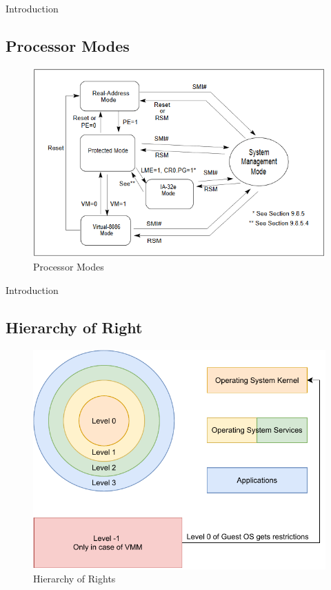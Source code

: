 \documentclass[11pt, aspectratio=169, modernfonts]{beamer}
\theoremstyle{definition}
\theoremstyle{remark}
\begin{document}
\begin{frame}{Introduction}
    \subsection{Processor Modes}
    \begin{figure}
        \centering
        \includegraphics[scale=0.56]{graphics/ProcessorModes.PNG}
        \caption{Processor Modes \cite{architecture64_sof_dev_manuel_vol_3}}
        \label{fig:processor_modes}
    \end{figure}
\end{frame}

\begin{frame}{Introduction}
    \subsection{Hierarchy of Right}
    \begin{figure}
        \centering
        \includegraphics[scale=0.65]{graphics/hierarchyx86.pdf}
        \caption{Hierarchy of Rights}
        \label{fig:x86_hierarchy}
    \end{figure}
\end{frame}
\end{document}
